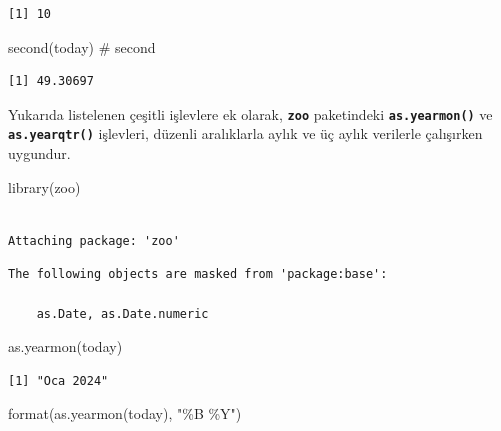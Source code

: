 \documentclass[
  letterpaper,
  DIV=11,
  numbers=noendperiod]{scrreprt}
\newenvironment{Shaded}{\begin{snugshade}}{\end{snugshade}}
\newcommand{\CommentTok}[1]{\textcolor[rgb]{0.37,0.37,0.37}{#1}}
\newcommand{\FunctionTok}[1]{\textcolor[rgb]{0.28,0.35,0.67}{#1}}
\newcommand{\NormalTok}[1]{\textcolor[rgb]{0.00,0.23,0.31}{#1}}
\newcommand{\StringTok}[1]{\textcolor[rgb]{0.13,0.47,0.30}{#1}}
\begin{document}
\begin{verbatim}
[1] 10
\end{verbatim}

\begin{Shaded}
\begin{Highlighting}[]
\FunctionTok{second}\NormalTok{(today) }\CommentTok{\# second}
\end{Highlighting}
\end{Shaded}

\begin{verbatim}
[1] 49.30697
\end{verbatim}

Yukarıda listelenen çeşitli işlevlere ek olarak, \textbf{\texttt{zoo}}
paketindeki \textbf{\texttt{as.yearmon()}} ve
\textbf{\texttt{as.yearqtr()}} işlevleri, düzenli aralıklarla aylık ve
üç aylık verilerle çalışırken uygundur.

\begin{Shaded}
\begin{Highlighting}[]
\FunctionTok{library}\NormalTok{(zoo)}
\end{Highlighting}
\end{Shaded}

\begin{verbatim}

Attaching package: 'zoo'
\end{verbatim}

\begin{verbatim}
The following objects are masked from 'package:base':

    as.Date, as.Date.numeric
\end{verbatim}

\begin{Shaded}
\begin{Highlighting}[]
\FunctionTok{as.yearmon}\NormalTok{(today)}
\end{Highlighting}
\end{Shaded}

\begin{verbatim}
[1] "Oca 2024"
\end{verbatim}

\begin{Shaded}
\begin{Highlighting}[]
\FunctionTok{format}\NormalTok{(}\FunctionTok{as.yearmon}\NormalTok{(today), }\StringTok{"\%B \%Y"}\NormalTok{)}
\end{Highlighting}
\end{Shaded}
\end{document}
